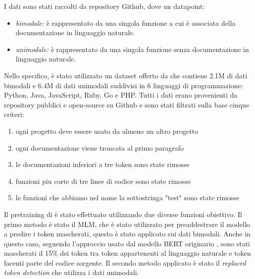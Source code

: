 \documentclass[../../Thesis.tex]{subfiles}
\begin{document}
I dati sono stati raccolti da repository Github, dove un datapoint:
\begin{itemize}
    \item \emph{bimodale:} è rappresentato da una singola funzione a cui è associata della documentazione in linguaggio naturale.
    \item \emph{unimodale:} è rappresentato da una singola funzione senza documentazione in 
    linguaggio naturale.
\end{itemize}
Nello specifico, è stato utilizzato un dataset offerto da \cite{CodeBERTDataset} che contiene 2.1M di dati bimodali e 6.4M di dati unimodali suddivisi in 6 linguaggi di programmazione: Python, Java, JavaScript, Ruby, Go e PHP. Tutti i dati erano provenienti da repository pubblici e open-source su Github e sono stati filtrati sulla base cinque criteri:
\begin{enumerate}
    \item ogni progetto deve essere usato da almeno un altro progetto 
    \item ogni documentazione viene troncata al primo paragrafo
    \item le documentazioni inferiori a tre token sono state rimosse
    \item funzioni piu corte di tre linee di codice sono state rimosse
    \item le funzioni che abbiamo nel nome la sottostringa "test" sono state rimosse
\end{enumerate}

Il pretraining di è stato effettuato utilizzando due diverse funzioni obiettivo. Il primo metodo è stato il MLM, che è stato utilizzato per preaddestrare il modello a predire i token mascherati, questo è stato applicato sui dati bimodali. Anche in questo caso, seguendo l'approccio usato dal modello BERT originario \cite{BERT},  sono stati mascherati il 15\% dei token tra token appartenenti al linguaggio naturale e token facenti parte del codice sorgente. Il secondo metodo applicato è stato il \emph{replaced token detection} che utilizza i dati unimodali. 
\end{document}
